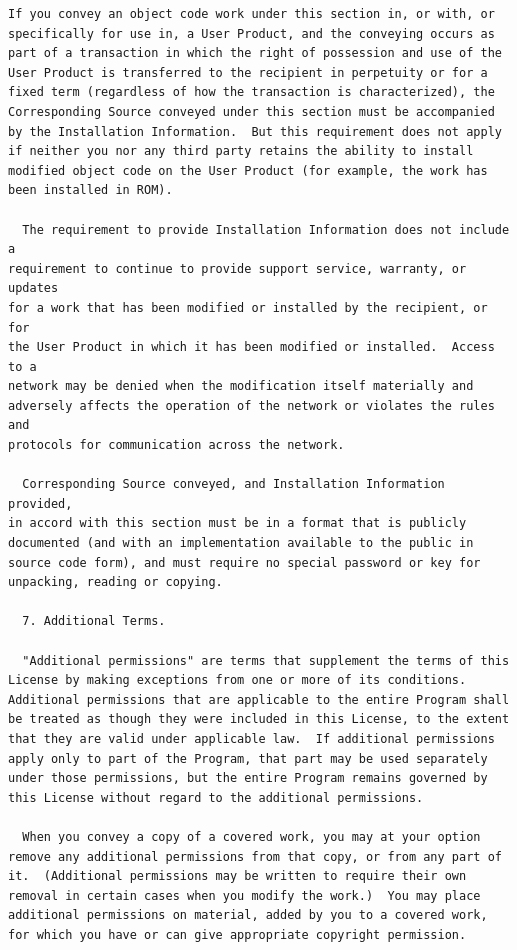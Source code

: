 \documentclass[letterpaper,10pt,english]{sphinxmanual}
\begin{document}
\begin{Verbatim}[commandchars=\\\{\}]
  If you convey an object code work under this section in, or with, or
specifically for use in, a User Product, and the conveying occurs as
part of a transaction in which the right of possession and use of the
User Product is transferred to the recipient in perpetuity or for a
fixed term (regardless of how the transaction is characterized), the
Corresponding Source conveyed under this section must be accompanied
by the Installation Information.  But this requirement does not apply
if neither you nor any third party retains the ability to install
modified object code on the User Product (for example, the work has
been installed in ROM).

  The requirement to provide Installation Information does not include a
requirement to continue to provide support service, warranty, or updates
for a work that has been modified or installed by the recipient, or for
the User Product in which it has been modified or installed.  Access to a
network may be denied when the modification itself materially and
adversely affects the operation of the network or violates the rules and
protocols for communication across the network.

  Corresponding Source conveyed, and Installation Information provided,
in accord with this section must be in a format that is publicly
documented (and with an implementation available to the public in
source code form), and must require no special password or key for
unpacking, reading or copying.

  7. Additional Terms.

  "Additional permissions" are terms that supplement the terms of this
License by making exceptions from one or more of its conditions.
Additional permissions that are applicable to the entire Program shall
be treated as though they were included in this License, to the extent
that they are valid under applicable law.  If additional permissions
apply only to part of the Program, that part may be used separately
under those permissions, but the entire Program remains governed by
this License without regard to the additional permissions.

  When you convey a copy of a covered work, you may at your option
remove any additional permissions from that copy, or from any part of
it.  (Additional permissions may be written to require their own
removal in certain cases when you modify the work.)  You may place
additional permissions on material, added by you to a covered work,
for which you have or can give appropriate copyright permission.


\end{Verbatim}
\end{document}
